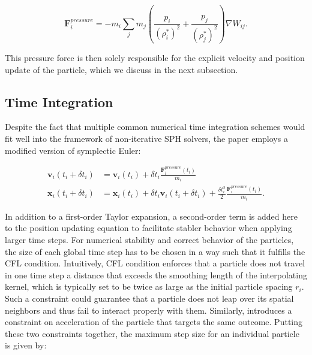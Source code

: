 \documentclass[
	11pt, 
	DIV10,
	ngerman,
	a4paper, 
	oneside, 
	headings=normal, 
	captions=tableheading,
	final, 
	numbers=noenddot
]{scrartcl}
\begin{document}
\begin{equation}
	\label{eq5}
	\boldsymbol{F}_{i}^{pressure} = -m_{i}\sum_{j}m_{j}\left(\frac{p_{i}}{(\rho_{i}^{*})^{2}} + \frac{p_{j}}{(\rho_{j}^{*})^{2}}\right)\nabla W_{ij}.
\end{equation}

This pressure force is then solely responsible for the explicit velocity and position update of the particle, which we discuss in the next subsection.

\subsection{Time Integration}

Despite the fact that multiple common numerical time integration schemes would fit well into the framework of non-iterative SPH solvers, the paper employs a modified version of symplectic Euler:

\begin{equation}
\begin{split}
	\label{eq6}
	\boldsymbol{v}_{i}(t_{i} + \delta t_{i}) &= \boldsymbol{v}_{i}(t_{i}) + \delta t_{i}\frac{\boldsymbol{F}_{i}^{pressure}(t_{i})}{m_{i}} \\
	\boldsymbol{x}_{i}(t_{i} + \delta t_{i}) &= \boldsymbol{x}_{i}(t_{i}) + \delta t_{i}\boldsymbol{v}_{i}(t_{i} + \delta t_{i}) + \frac{\delta t_{i}^{2}}{2}\frac{\boldsymbol{F}_{i}^{pressure}(t_{i})}{m_{i}}.
\end{split}
\end{equation}

In addition to a first-order Taylor expansion, a second-order term is added here to the position updating equation to facilitate stabler behavior when applying larger time steps. For numerical stability and correct behavior of the particles, the size of each global time step has to be chosen in a way such that it fulfills the CFL condition. Intuitively, CFL condition enforces that a particle does not travel in one time step a distance that exceeds the smoothing length of the interpolating kernel, which is typically set to be twice as large as the initial particle spacing $r_{i}$. Such a constraint could guarantee that a particle does not leap over its spatial neighbors and thus fail to interact properly with them. Similarly, \cite{bender2010boundary} introduces a constraint on acceleration of the particle that targets the same outcome. Putting these two constraints together, the maximum step size for an individual particle is given by:
\end{document}
